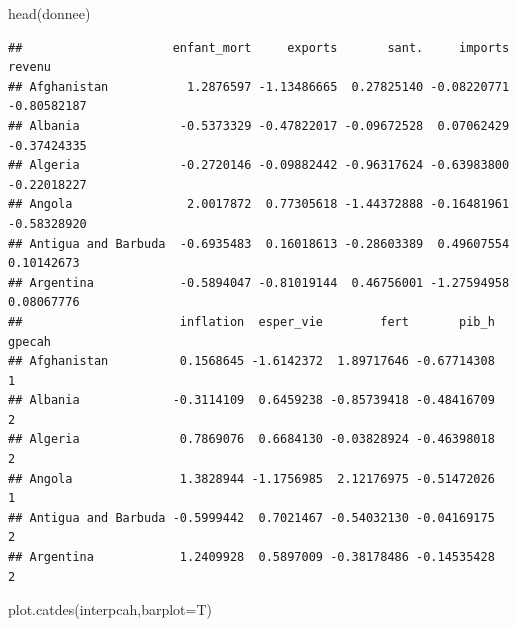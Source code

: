 \documentclass[
]{article}
\newenvironment{Shaded}{}{}
\newcommand{\AttributeTok}[1]{#1}
\newcommand{\FunctionTok}[1]{#1}
\newcommand{\NormalTok}[1]{#1}
\begin{document}
\begin{Shaded}
\begin{Highlighting}[]
\FunctionTok{head}\NormalTok{(donnee)}
\end{Highlighting}
\end{Shaded}

\begin{verbatim}
##                     enfant_mort     exports       sant.     imports      revenu
## Afghanistan           1.2876597 -1.13486665  0.27825140 -0.08220771 -0.80582187
## Albania              -0.5373329 -0.47822017 -0.09672528  0.07062429 -0.37424335
## Algeria              -0.2720146 -0.09882442 -0.96317624 -0.63983800 -0.22018227
## Angola                2.0017872  0.77305618 -1.44372888 -0.16481961 -0.58328920
## Antigua and Barbuda  -0.6935483  0.16018613 -0.28603389  0.49607554  0.10142673
## Argentina            -0.5894047 -0.81019144  0.46756001 -1.27594958  0.08067776
##                      inflation  esper_vie        fert       pib_h gpecah
## Afghanistan          0.1568645 -1.6142372  1.89717646 -0.67714308      1
## Albania             -0.3114109  0.6459238 -0.85739418 -0.48416709      2
## Algeria              0.7869076  0.6684130 -0.03828924 -0.46398018      2
## Angola               1.3828944 -1.1756985  2.12176975 -0.51472026      1
## Antigua and Barbuda -0.5999442  0.7021467 -0.54032130 -0.04169175      2
## Argentina            1.2409928  0.5897009 -0.38178486 -0.14535428      2
\end{verbatim}

\begin{Shaded}
\begin{Highlighting}[]
\FunctionTok{plot.catdes}\NormalTok{(interpcah,}\AttributeTok{barplot=}\NormalTok{T)}
\end{Highlighting}
\end{Shaded}
\end{document}
